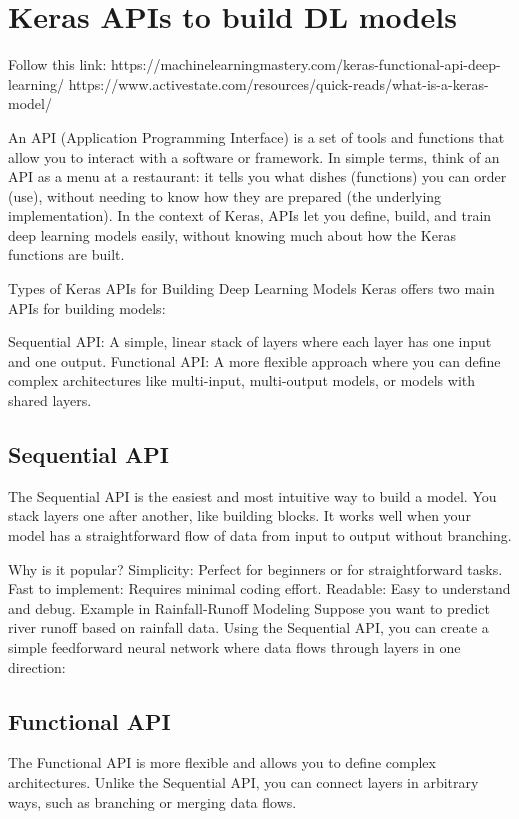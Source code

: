 \section{Keras APIs to build DL models}
Follow this link: https://machinelearningmastery.com/keras-functional-api-deep-learning/
https://www.activestate.com/resources/quick-reads/what-is-a-keras-model/

An API (Application Programming Interface) is a set of tools and functions that allow you to interact with a software or framework. In simple terms, think of an API as a menu at a restaurant: it tells you what dishes (functions) you can order (use), without needing to know how they are prepared (the underlying implementation). In the context of Keras, APIs let you define, build, and train deep learning models easily, without knowing much about how the Keras functions are built.

Types of Keras APIs for Building Deep Learning Models
Keras offers two main APIs for building models:

Sequential API: A simple, linear stack of layers where each layer has one input and one output.
Functional API: A more flexible approach where you can define complex architectures like multi-input, multi-output models, or models with shared layers.
\subsection{Sequential API}
The Sequential API is the easiest and most intuitive way to build a model. You stack layers one after another, like building blocks. It works well when your model has a straightforward flow of data from input to output without branching.

Why is it popular?
Simplicity: Perfect for beginners or for straightforward tasks.
Fast to implement: Requires minimal coding effort.
Readable: Easy to understand and debug.
Example in Rainfall-Runoff Modeling
Suppose you want to predict river runoff based on rainfall data. Using the Sequential API, you can create a simple feedforward neural network where data flows through layers in one direction:



\subsection{Functional API}
The Functional API is more flexible and allows you to define complex architectures. Unlike the Sequential API, you can connect layers in arbitrary ways, such as branching or merging data flows.

